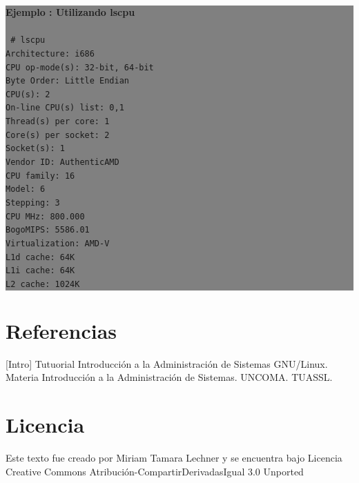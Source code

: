 \documentclass[12pt]{article}
\begin{document}
\colorbox{grey}{\parbox[t]{0.95\linewidth}{ \vspace*{0.5cm} { 
{\bf Ejemplo : Utilizando lscpu }
\\ \\
{\tt \small
\# lscpu \\
Architecture:          i686\\
CPU op-mode(s):        32-bit, 64-bit\\
Byte Order:            Little Endian\\
CPU(s):                2\\
On-line CPU(s) list:   0,1\\
Thread(s) per core:    1\\
Core(s) per socket:    2\\
Socket(s):             1\\
Vendor ID:             AuthenticAMD\\
CPU family:            16\\
Model:                 6\\
Stepping:              3\\
CPU MHz:               800.000\\
BogoMIPS:              5586.01\\
Virtualization:        AMD-V\\
L1d cache:             64K\\
L1i cache:             64K\\
L2 cache:              1024K\\
}
} \vspace*{0.5cm} } } 


\section*{Referencias}

[Intro] Tutuorial Introducción a la Administración de Sistemas GNU/Linux. Materia Introducción
a la Administración de Sistemas. UNCOMA. TUASSL. 

\section*{Licencia}

Este texto fue creado por Miriam Tamara Lechner y se encuentra bajo 
Licencia Creative Commons Atribución-CompartirDerivadasIgual 3.0 Unported
\end{document}
